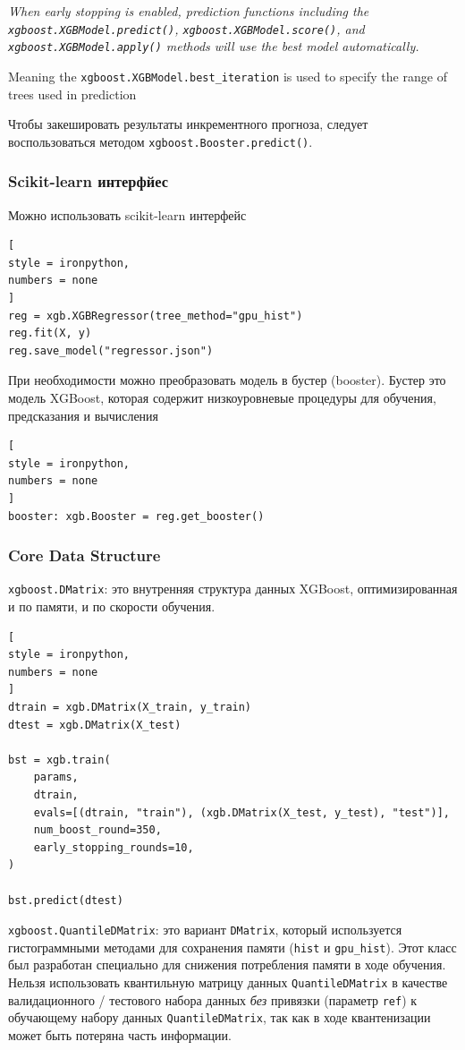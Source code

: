 \documentclass[%
	11pt,
	a4paper,
	utf8,
		]{article}
\begin{document}
{\itshape
When early stopping is enabled, prediction functions including the \verb|xgboost.XGBModel.predict()|, \verb|xgboost.XGBModel.score()|, and \verb|xgboost.XGBModel.apply()| methods will use the best model automatically.

Meaning the \verb|xgboost.XGBModel.best_iteration| is used to specify the range of trees used in prediction
}

Чтобы закешировать результаты инкрементного прогноза, следует воспользоваться методом \verb|xgboost.Booster.predict()|.

\subsubsection{Scikit-learn интерфйес}

Можно использовать scikit-learn интерфейс
\begin{lstlisting}[
style = ironpython,
numbers = none
]
reg = xgb.XGBRegressor(tree_method="gpu_hist")
reg.fit(X, y)
reg.save_model("regressor.json")
\end{lstlisting}

При необходимости можно преобразовать модель в бустер (booster). Бустер это модель XGBoost, которая содержит низкоуровневые процедуры для обучения, предсказания и вычисления
\begin{lstlisting}[
style = ironpython,
numbers = none
]
booster: xgb.Booster = reg.get_booster()
\end{lstlisting}

\subsubsection{Core Data Structure}

\verb|xgboost.DMatrix|: это внутренняя структура данных XGBoost, оптимизированная и по памяти, и по скорости обучения.
\begin{lstlisting}[
style = ironpython,
numbers = none
]
dtrain = xgb.DMatrix(X_train, y_train)
dtest = xgb.DMatrix(X_test)

bst = xgb.train(
    params,
    dtrain,
    evals=[(dtrain, "train"), (xgb.DMatrix(X_test, y_test), "test")],
    num_boost_round=350,
    early_stopping_rounds=10,
)

bst.predict(dtest)
\end{lstlisting}

\verb|xgboost.QuantileDMatrix|: это вариант \verb|DMatrix|, который используется гистограммными методами для сохранения памяти (\verb|hist| и \verb|gpu_hist|). Этот класс был разработан специально для снижения потребления памяти в ходе обучения. Нельзя использовать квантильную матрицу данных \verb|QuantileDMatrix| в качестве валидационного / тестового набора данных \emph{без} привязки (параметр \verb|ref|) к обучающему набору данных \verb|QuantileDMatrix|, так как в ходе квантенизации может быть потеряна часть информации.
\end{document}

